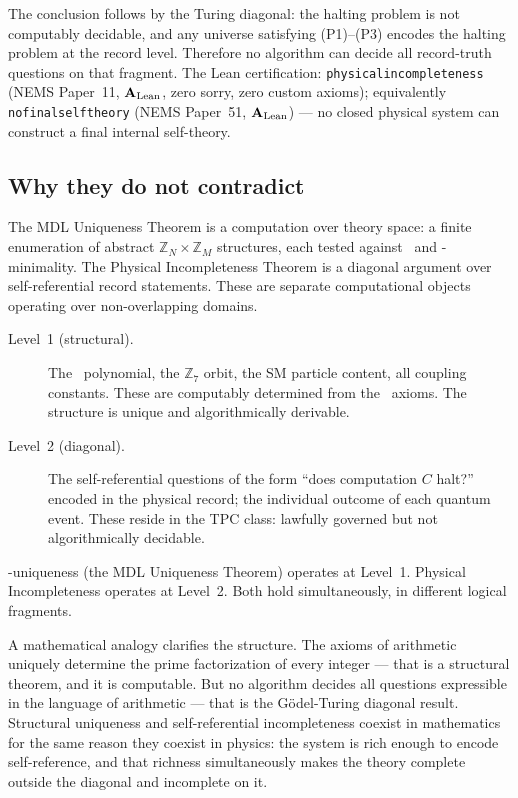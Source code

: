 \documentclass[11pt,openany]{book}
\theoremstyle{remark}
\newcommand{\GTE}{\text{GTE}}
\newcommand{\MDL}{\text{MDL}}
\newcommand{\PSC}{\text{PSC}}
\newcommand{\ZS}{\mathbb{Z}_7}
\newcommand{\lean}[1]{%
  \penalty-100
  \begingroup\def\_{\textunderscore\allowbreak}\texttt{#1}\endgroup}
\newcommand{\CatAL}{\ensuremath{\textbf{A}_{\rm Lean}}}
\begin{document}
The conclusion follows by the Turing diagonal: the halting problem is not computably
decidable, and any universe satisfying (P1)--(P3) encodes the halting problem at the
record level. Therefore no algorithm can decide all record-truth questions on that
fragment. The Lean certification: \lean{physical\_incompleteness} (NEMS Paper~11,
\CatAL, zero sorry, zero custom axioms); equivalently \lean{no\_final\_self\_theory}
(NEMS Paper~51, \CatAL) --- no closed physical system can construct a final internal
self-theory.

\subsection*{Why they do not contradict}

The MDL Uniqueness Theorem is a computation over theory space: a finite enumeration of abstract
$\mathbb{Z}_N \times \mathbb{Z}_M$ structures, each tested against \PSC\ and
\MDL-minimality. The Physical Incompleteness Theorem is a diagonal argument over
self-referential record statements. These are separate computational objects
operating over non-overlapping domains.

\begin{tcolorbox}[colback=green!5,colframe=green!50!black,
  title={Coexistence: The Precise Statement}]
\begin{description}
\item[Level~1 (structural).]  The \GTE\ polynomial, the $\ZS$ orbit, the SM particle
  content, all coupling constants. These are computably determined from the \PSC\
  axioms. The structure is unique and algorithmically derivable.
\item[Level~2 (diagonal).]  The self-referential questions of the form ``does
  computation $C$ halt?'' encoded in the physical record; the individual outcome of
  each quantum event. These reside in the TPC class: lawfully governed but not
  algorithmically decidable.
\end{description}
\PSC-uniqueness (the MDL Uniqueness Theorem) operates at Level~1. Physical Incompleteness operates at
Level~2. Both hold simultaneously, in different logical fragments.
\end{tcolorbox}

A mathematical analogy clarifies the structure. The axioms of arithmetic uniquely
determine the prime factorization of every integer --- that is a structural theorem,
and it is computable. But no algorithm decides all questions expressible in the
language of arithmetic --- that is the Gödel-Turing diagonal result. Structural
uniqueness and self-referential incompleteness coexist in mathematics for the same
reason they coexist in physics: the system is rich enough to encode self-reference,
and that richness simultaneously makes the theory complete outside the diagonal
and incomplete on it.
\end{document}
